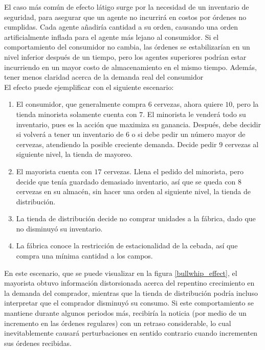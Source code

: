 El caso m\'as com\'un de efecto l\'atigo surge por la necesidad de un inventario de seguridad, para asegurar que un agente no incurrir\'a en costos por \'ordenes no cumplidas. Cada agente a\~nadir\'ia cantidad a su orden, causando una orden artificialmente inflada para el agente m\'as lejano al consumidor. Si el comportamiento del consumidor no cambia, las \'ordenes se estabilizar\'ian en un nivel inferior despu\'es de un tiempo, pero los agentes superiores podr\'ian estar incurriendo en un mayor costo de almacenamiento en el mismo tiempo. Adem\'as, tener menos claridad acerca de la demanda real del consumidor \\

El efecto puede ejemplificar con el siguiente escenario:

\begin{enumerate}
    \item El consumidor, que generalmente compra $6$ cervezas, ahora quiere $10$, pero la tienda minorista solamente cuenta con $7$. El minorista le venderá todo su inventario, pues es la acci\'on que maximiza su ganancia. Despu\'es, debe decidir si volverá a tener un inventario de $6$ o si debe pedir un número mayor de cervezas, atendiendo la posible creciente demanda. Decide pedir $9$ cervezas al siguiente nivel, la tienda de mayoreo.
    \item El mayorista cuenta con $17$ cervezas. Llena el pedido del minorista, pero decide que ten\'ia guardado demasiado inventario, as\'i que se queda con $8$ cervezas en su almac\'en, sin hacer una orden al siguiente nivel, la tienda de distribución.
    \item La tienda de distribuci\'on decide no comprar unidades a la f\'abrica, dado que no disminuy\'o su inventario.
    \item La f\'abrica conoce la restricci\'on de estacionalidad de la cebada, as\'i que compra una m\'inima cantidad a los campos.
\end{enumerate}

En este escenario, que se puede visualizar en la figura \ref{bullwhip_effect}, el mayorista obtuvo informaci\'on distorsionada acerca del repentino crecimiento en la demanda del comprador, mientras que la tienda de distribución podr\'ia incluso interpretar que el comprador disminuy\'o su consumo. Si este comportamiento se mantiene durante algunos periodos m\'as, recibir\'ia la noticia (por medio de un incremento en las \'ordenes regulares) con un retraso considerable, lo cual inevitablemente causar\'a perturbaciones en sentido contrario cuando incrementen sus \'ordenes recibidas.\\

